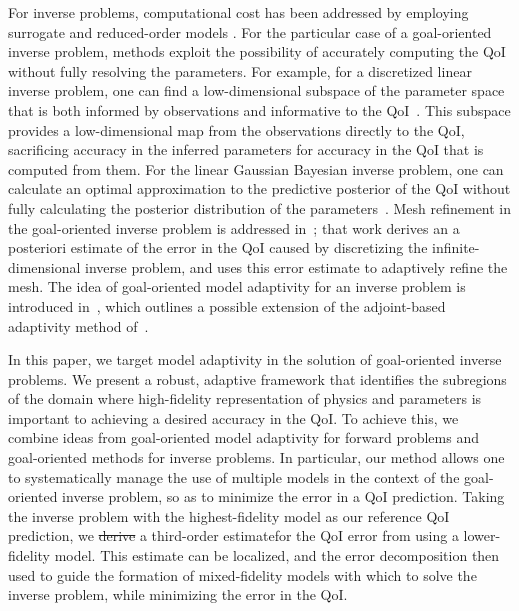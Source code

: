 \documentclass[review,sort&compress]{elsarticle}
\providecommand{\DIFaddtex}[1]{{\protect\color{blue}\uwave{#1}}} %
\providecommand{\DIFdeltex}[1]{{\protect\color{red}\sout{#1}}}                      %
\providecommand{\DIFaddbegin}{} %
\providecommand{\DIFaddend}{} %
\providecommand{\DIFdelbegin}{} %
\providecommand{\DIFdelend}{} %
\providecommand{\DIFadd}[1]{\texorpdfstring{\DIFaddtex{#1}}{#1}} %
\providecommand{\DIFdel}[1]{\texorpdfstring{\DIFdeltex{#1}}{}} %
\newcommand{\DIFscaledelfig}{0.5}
\newlength{\DIFdelgraphicswidth} %
\newlength{\DIFdelgraphicsheight} %
\newcommand{\DIFaddincludegraphics}[2][]{{\color{blue}\fbox{\DIFOincludegraphics[#1]{#2}}}} %
\newcommand{\DIFdelincludegraphics}[2][]{%
\sbox{\DIFdelgraphicsbox}{\DIFOincludegraphics[#1]{#2}}%
\settoboxwidth{\DIFdelgraphicswidth}{\DIFdelgraphicsbox} %
\settoboxtotalheight{\DIFdelgraphicsheight}{\DIFdelgraphicsbox} %
\scalebox{\DIFscaledelfig}{%
\parbox[b]{\DIFdelgraphicswidth}{\usebox{\DIFdelgraphicsbox}\\[-\baselineskip] \rule{\DIFdelgraphicswidth}{0em}}\llap{\resizebox{\DIFdelgraphicswidth}{\DIFdelgraphicsheight}{%
\setlength{\unitlength}{\DIFdelgraphicswidth}%
\begin{picture}(1,1)%
\thicklines\linethickness{2pt} %
{\color[rgb]{1,0,0}\put(0,0){\framebox(1,1){}}}%
{\color[rgb]{1,0,0}\put(0,0){\line( 1,1){1}}}%
{\color[rgb]{1,0,0}\put(0,1){\line(1,-1){1}}}%
\end{picture}%
}\hspace*{3pt}}} %
} %
\DeclareRobustCommand{\DIFaddbegin}{\DIFOaddbegin \let\includegraphics\DIFaddincludegraphics} %
\DeclareRobustCommand{\DIFaddend}{\DIFOaddend \let\includegraphics\DIFOincludegraphics} %
\DeclareRobustCommand{\DIFdelbegin}{\DIFOdelbegin \let\includegraphics\DIFdelincludegraphics} %
\DeclareRobustCommand{\DIFdelend}{\DIFOaddend \let\includegraphics\DIFOincludegraphics} %
\begin{document}
For inverse problems, computational cost has been addressed by employing surrogate and reduced-order models \cite{MarzNajmRahn07, WangZab04, StefSanNav15, Frangosetal10}. For the particular case of a goal-oriented inverse problem, methods exploit the possibility of accurately computing the QoI without fully resolving the parameters. For example, for a discretized linear inverse problem, one can find a low-dimensional subspace of the parameter space that is both informed by observations and informative to the QoI~\cite{LiebWill13}. This subspace provides a low-dimensional map from the observations directly to the QoI, sacrificing accuracy in the inferred parameters for accuracy in the QoI that is computed from them. For the linear Gaussian Bayesian inverse problem, one can calculate an optimal approximation to the predictive posterior of the QoI without fully calculating the posterior distribution of the parameters~\cite{Span16}. Mesh refinement in the goal-oriented inverse problem is addressed in~\cite{BecVex05}; that work derives an a posteriori estimate of the error in the QoI caused by discretizing the infinite-dimensional inverse problem, and uses this error estimate to adaptively refine the mesh. The idea of goal-oriented model adaptivity for an inverse problem is introduced in~\cite{OdenPrudetal10}, which outlines a possible extension of the adjoint-based adaptivity method of~\cite{OdenPrudetal06}.

In this paper, we target model adaptivity in the solution of goal-oriented inverse problems. We present a robust, adaptive framework that identifies the subregions of the domain where high-fidelity representation of physics and parameters is important to achieving a desired accuracy in the QoI. To achieve this, we combine ideas from goal-oriented model adaptivity for forward problems and goal-oriented methods for inverse problems. In particular, our method allows one to systematically manage the use of multiple models in the context of the goal-oriented inverse problem, so as to minimize the error in a QoI prediction. Taking the inverse problem with the highest-fidelity model as our reference QoI prediction, we \DIFdelbegin \DIFdel{derive }\DIFdelend \DIFaddbegin \DIFadd{obtain }\DIFaddend a third-order estimate\DIFaddbegin \DIFadd{, evaluated using an adjoint approach, }\DIFaddend for the QoI error from using a lower-fidelity model. This estimate can be localized, and the error decomposition then used to guide the formation of mixed-fidelity models with which to solve the inverse problem, while minimizing the error in the QoI. 
\end{document}
